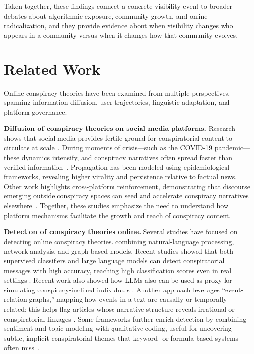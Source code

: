 \documentclass[letterpaper]{article} %
\newcommand{\spara}[1]{\smallskip\noindent\textbf{#1}}
\begin{document}
Taken together, these findings connect a concrete visibility event to broader debates about algorithmic exposure, community growth, and online radicalization, and they provide evidence about when visibility changes who appears in a community versus when it changes how that community evolves.

\section{Related Work}
Online conspiracy theories have been examined from multiple perspectives, spanning information diffusion, user trajectories, linguistic adaptation, and platform governance.

\spara{Diffusion of conspiracy theories on social media platforms.}
Research shows that social media provides fertile ground for conspiratorial content to circulate at scale~\cite{bessi2015science}.
During moments of crisis---such as the COVID-19 pandemic---these dynamics intensify, and conspiracy narratives often spread faster than verified information~\cite{kauk2021understanding}.
Propagation has been modeled using epidemiological frameworks, revealing higher virality and persistence relative to factual news.
Other work highlights cross-platform reinforcement, demonstrating that discourse emerging outside conspiracy spaces can seed and accelerate conspiracy narratives elsewhere~\cite{paudel2021soros}.
Together, these studies emphasize the need to understand how platform mechanisms facilitate the growth and reach of conspiracy content.

\spara{Detection of conspiracy theories online.}
Several studies have focused on detecting online conspiracy theories. 
combining natural-language processing, network analysis, and graph-based models. Recent studies showed that both supervised classifiers and large language models can detect conspiratorial messages with high accuracy, reaching high classification scores even in real settings \cite{pustet-etal-2024-detection,corso-etal-2025-conspiracy}. Recent work also showed how LLMs also can be used as proxy for simulating conspiracy-inclined individuals \cite{corso2025androids}. 
Another approach leverages ``event-relation graphs,'' mapping how events in a text are causally or temporally related; this helps flag articles whose narrative structure reveals irrational or conspiratorial linkages \cite{lei2023identifying}. 
Some frameworks further enrich detection by combining sentiment and topic modeling with qualitative coding, useful for uncovering subtle, implicit conspiratorial themes that keyword- or formula-based systems often miss~\cite{langguth2023coco}.
\end{document}
